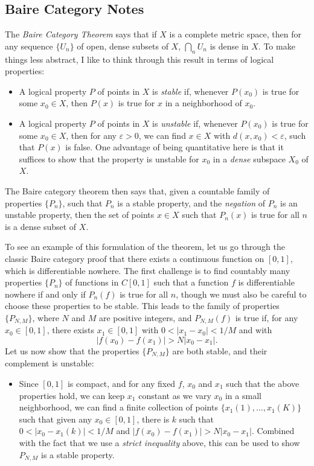\documentclass[answers]{exam}
\theoremstyle{problemstyle}
\newcommand{\1}[1]{\textbf{1}_{\left[#1\right]}} %
\begin{document}
\begin{questions}
\newpage
\section{Baire Category Notes}

The \emph{Baire Category Theorem} says that if $X$ is a complete metric space, then for any sequence $\{ U_n \}$ of open, dense subsets of $X$, $\bigcap_n U_n$ is dense in $X$. To make things less abstract, I like to think through this result in terms of logical properties:
%
\begin{itemize}
	\item A logical property $P$ of points in $X$ is \emph{stable} if, whenever $P(x_0)$ is true for some $x_0 \in X$, then $P(x)$ is true for $x$ in a neighborhood of $x_0$.

	\item A logical property $P$ of points in $X$ is \emph{unstable} if, whenever $P(x_0)$ is true for some $x_0 \in X$, then for any $\varepsilon > 0$, we can find $x \in X$ with $d(x,x_0) < \varepsilon$, such that $P(x)$ is false. One advantage of being quantitative here is that it suffices to show that the property is unstable for $x_0$ in a \emph{dense} subspace $X_0$ of $X$.
\end{itemize}
%
The Baire category theorem then says that, given a countable family of properties $\{ P_n \}$, such that $P_n$ is a stable property, and the \emph{negation} of $P_n$ is an unstable property, then the set of points $x \in X$ such that $P_n(x)$ is true for all $n$ is a dense subset of $X$.

To see an example of this formulation of the theorem, let us go through the classic Baire category proof that there exists a continuous function on $[0,1]$, which is differentiable nowhere. The first challenge is to find countably many properties $\{ P_n \}$ of functions in $C[0,1]$ such that a function $f$ is differentiable nowhere if and only if $P_n(f)$ is true for all $n$, though we must also be careful to choose these properties to be stable. This leads to the family of properties $\{ P_{N,M} \}$, where $N$ and $M$ are positive integers, and $P_{N,M}(f)$ is true if, for any $x_0 \in [0,1]$, there exists $x_1 \in [0,1]$ with $0 < |x_1 - x_0| < 1/M$ and with
%
\[ |f(x_0) - f(x_1)| > N|x_0 - x_1|. \]
%
Let us now show that the properties $\{ P_{N,M} \}$ are both stable, and their complement is unstable:
%
\begin{itemize}
	\item Since $[0,1]$ is compact, and for any fixed $f$, $x_0$ and $x_1$ such that the above properties hold, we can keep $x_1$ constant as we vary $x_0$ in a small neighborhood, we can find a finite collection of points $\{ x_1(1),\dots, x_1(K) \}$ such that given any $x_0 \in [0,1]$, there is $k$ such that $0 < |x_0 - x_1(k)| < 1/M$ and $|f(x_0) - f(x_1)| > N|x_0 - x_1|$. Combined with the fact that we use a \emph{strict inequality} above, this can be used to show $P_{N,M}$ is a stable property.


\end{itemize}
\end{questions}
\end{document}
